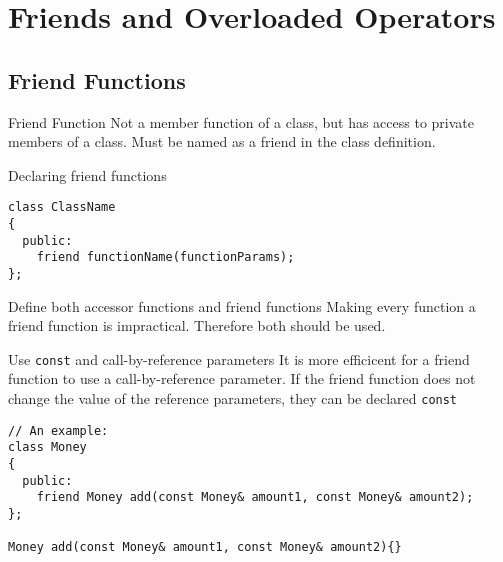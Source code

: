 \documentclass[\main/notes.tex]{subfiles}
\begin{document}
	\setcounter{chapter}{5}
	\chapter{Friends and Overloaded Operators}
		\section{Friend Functions}
			\begin{definition}{Friend Function}
				Not a member function of a class, but has access to private members of a class. Must be named as a friend in the class definition.
			\end{definition}
			\begin{codebox}{Declaring friend functions}
				\begin{verbatim}
class ClassName
{
  public:
    friend functionName(functionParams);
};
				\end{verbatim}
			\end{codebox}
			\begin{sidenote}{Define both accessor functions and friend functions}
				Making every function a friend function is impractical. Therefore both should be used.
			\end{sidenote}
			\begin{sidenote}{Use \texttt{const} and call-by-reference parameters}
				It is more efficicent for a friend function to use a call-by-reference parameter. If the friend function does not change the value of the reference parameters, they can be declared \texttt{const}
				\begin{verbatim}
// An example:
class Money
{
  public:
    friend Money add(const Money& amount1, const Money& amount2);
};

Money add(const Money& amount1, const Money& amount2){}
				\end{verbatim}
			\end{sidenote}
\end{document}
